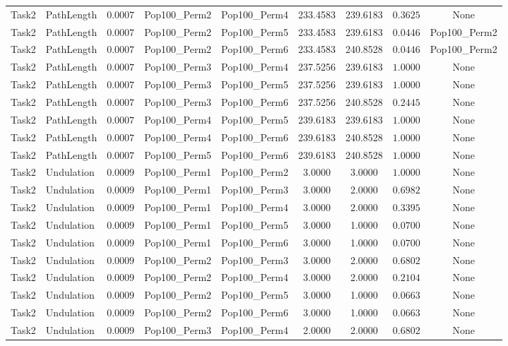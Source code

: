 \documentclass[8pt]{article}
\begin{document}
\begin{longtable}{llccccccc}
Task2 & PathLength & $0.0007$ & Pop100\_Perm2 & Pop100\_Perm4 & 233.4583 & 239.6183 & $0.3625$ & None \\
Task2 & PathLength & $0.0007$ & Pop100\_Perm2 & Pop100\_Perm5 & 233.4583 & 239.6183 & $0.0446$ & Pop100\_Perm2 \\
Task2 & PathLength & $0.0007$ & Pop100\_Perm2 & Pop100\_Perm6 & 233.4583 & 240.8528 & $0.0446$ & Pop100\_Perm2 \\
Task2 & PathLength & $0.0007$ & Pop100\_Perm3 & Pop100\_Perm4 & 237.5256 & 239.6183 & $1.0000$ & None \\
Task2 & PathLength & $0.0007$ & Pop100\_Perm3 & Pop100\_Perm5 & 237.5256 & 239.6183 & $1.0000$ & None \\
Task2 & PathLength & $0.0007$ & Pop100\_Perm3 & Pop100\_Perm6 & 237.5256 & 240.8528 & $0.2445$ & None \\
Task2 & PathLength & $0.0007$ & Pop100\_Perm4 & Pop100\_Perm5 & 239.6183 & 239.6183 & $1.0000$ & None \\
Task2 & PathLength & $0.0007$ & Pop100\_Perm4 & Pop100\_Perm6 & 239.6183 & 240.8528 & $1.0000$ & None \\
Task2 & PathLength & $0.0007$ & Pop100\_Perm5 & Pop100\_Perm6 & 239.6183 & 240.8528 & $1.0000$ & None \\
Task2 & Undulation & $0.0009$ & Pop100\_Perm1 & Pop100\_Perm2 & 3.0000 & 3.0000 & $1.0000$ & None \\
Task2 & Undulation & $0.0009$ & Pop100\_Perm1 & Pop100\_Perm3 & 3.0000 & 2.0000 & $0.6982$ & None \\
Task2 & Undulation & $0.0009$ & Pop100\_Perm1 & Pop100\_Perm4 & 3.0000 & 2.0000 & $0.3395$ & None \\
Task2 & Undulation & $0.0009$ & Pop100\_Perm1 & Pop100\_Perm5 & 3.0000 & 1.0000 & $0.0700$ & None \\
Task2 & Undulation & $0.0009$ & Pop100\_Perm1 & Pop100\_Perm6 & 3.0000 & 1.0000 & $0.0700$ & None \\
Task2 & Undulation & $0.0009$ & Pop100\_Perm2 & Pop100\_Perm3 & 3.0000 & 2.0000 & $0.6802$ & None \\
Task2 & Undulation & $0.0009$ & Pop100\_Perm2 & Pop100\_Perm4 & 3.0000 & 2.0000 & $0.2104$ & None \\
Task2 & Undulation & $0.0009$ & Pop100\_Perm2 & Pop100\_Perm5 & 3.0000 & 1.0000 & $0.0663$ & None \\
Task2 & Undulation & $0.0009$ & Pop100\_Perm2 & Pop100\_Perm6 & 3.0000 & 1.0000 & $0.0663$ & None \\
Task2 & Undulation & $0.0009$ & Pop100\_Perm3 & Pop100\_Perm4 & 2.0000 & 2.0000 & $0.6802$ & None \\

\end{longtable}
\end{document}
